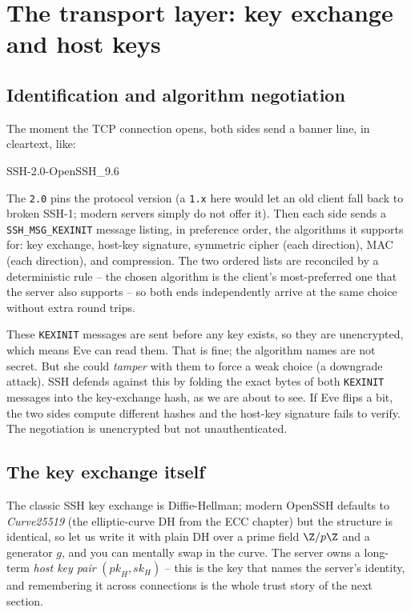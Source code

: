 \section{The transport layer: key exchange and host keys}

\subsection{Identification and algorithm negotiation}

The moment the TCP connection opens, both sides send a banner line, in cleartext, like:

\begin{center}\ttfamily SSH-2.0-OpenSSH\_9.6\end{center}

The \texttt{2.0} pins the protocol version (a \texttt{1.x} here would let an old client fall back to broken SSH-1; modern servers simply do not offer it). Then each side sends a \texttt{SSH\_MSG\_KEXINIT} message listing, in preference order, the algorithms it supports for: key exchange, host-key signature, symmetric cipher (each direction), MAC (each direction), and compression. The two ordered lists are reconciled by a deterministic rule -- the chosen algorithm is the client's most-preferred one that the server also supports -- so both ends independently arrive at the same choice without extra round trips.

These \texttt{KEXINIT} messages are sent before any key exists, so they are unencrypted, which means Eve can read them. That is fine; the algorithm names are not secret. But she could \emph{tamper} with them to force a weak choice (a downgrade attack). SSH defends against this by folding the exact bytes of both \texttt{KEXINIT} messages into the key-exchange hash, as we are about to see. If Eve flips a bit, the two sides compute different hashes and the host-key signature fails to verify. The negotiation is unencrypted but not unauthenticated.

\subsection{The key exchange itself}

The classic SSH key exchange is Diffie-Hellman; modern OpenSSH defaults to \emph{Curve25519} (the elliptic-curve DH from the ECC chapter) but the structure is identical, so let us write it with plain DH over a prime field $\Z/p\Z$ and a generator $g$, and you can mentally swap in the curve. The server owns a long-term \emph{host key pair} $(\textit{pk}_H, \textit{sk}_H)$ -- this is the key that names the server's identity, and remembering it across connections is the whole trust story of the next section.

